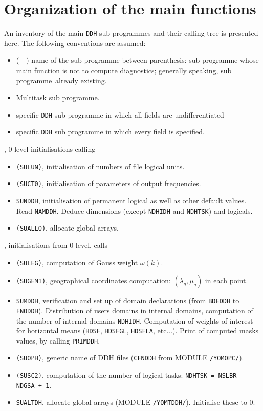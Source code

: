 \section{Organization of the main functions}
An inventory of the main {\tt DDH} sub programmes and their calling tree is presented here. The following conventions are assumed:
\begin{itemize}
      \item (---) name of the sub programme between parenthesis: sub programme whose main function is not to compute diagnostics; generally speaking, sub programme\ARP\ already existing.
      \item {} Multitask sub programme.
      \item {} specific {\tt DDH} sub programme in which all fields are undifferentiated
      \item {} specific {\tt DDH} sub programme in which every field is specified.
\end{itemize}
, 0 level initialisations calling
\begin{itemize}
      \item {\tt (SULUN)}, initialisation of numbers of file logical units.
      \item {\tt (SUCT0)}, initialisation of parameters of output frequencies.
      \item {\tt SUNDDH}, initialisation of permanent logical as well as other default values.
            Read {\tt NAMDDH}.
            Deduce dimensions (except {\tt NDHIDH} and {\tt NDHTSK}) and logicals. 
      \item {\tt (SUALLO)}, allocate global arrays. 
\end{itemize}
, initialisations from 0 level, calls
\begin{itemize}
      \item {\tt (SULEG)}, computation of Gauss weight $\omega(k)$.
      \item {\tt (SUGEM1)}, geographical coordinates computation: $(\lambda_{q},\mu_{q})$ in each point.
\item {\tt SUMDDH}, verification and set up of domain declarations (from {\tt BDEDDH} to {\tt FNODDH}). Distribution of users domains in internal domains, computation of the number of internal domains {\tt NDHIDH}. Computation of weights of interest for horizontal means ({\tt HDSF}, {\tt HDSFGL},    {\tt HDSFLA}, etc...). Print of computed masks values, by calling {\tt PRIMDDH}.
      \item {\tt (SUOPH)}, generic name of DDH files ({\tt CFNDDH} from MODULE {\tt /YOMOPC/}).
      \item {\tt (SUSC2)}, computation of the number of logical tasks: {\tt NDHTSK = NSLBR - NDGSA + 1}.
      \item {\tt SUALTDH}, allocate global arrays (MODULE {\tt /YOMTDDH/}).
      Initialise these to $0$.
\end{itemize}
